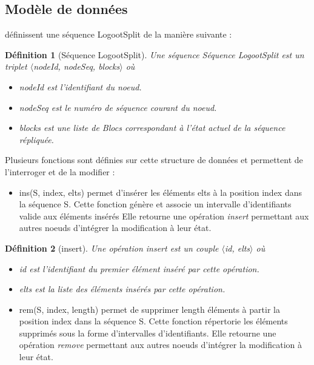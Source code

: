 \documentclass[12pt]{thesul}
\newtheorem{definition}{Définition}
\begin{document}
\subsection{Modèle de données}

\textcite{2013-logootsplit} définissent une séquence LogootSplit de la manière suivante :

\begin{definition}[Séquence LogootSplit]
  Une séquence \emph{Séquence LogootSplit} est un triplet $\langle$nodeId, nodeSeq, blocks$\rangle$ où
  \begin{itemize}
    \item nodeId est l'identifiant du noeud.
    \item nodeSeq est le numéro de séquence courant du noeud.
    \item blocks est une liste de Blocs correspondant à l'état actuel de la séquence répliquée.
  \end{itemize}
\end{definition}

Plusieurs fonctions sont définies sur cette structure de données et permettent de l'interroger et de la modifier :

\begin{itemize}
  \item ins(S, index, elts) permet d'insérer les éléments elts à la position index dans la séquence S.
    Cette fonction génère et associe un intervalle d'identifiants valide aux éléments insérés
    Elle retourne une opération \emph{insert} permettant aux autres noeuds d'intégrer la modification à leur état.
\end{itemize}

\begin{definition}[insert]
  Une opération \emph{insert} est un couple $\langle$id, elts$\rangle$ où
  \begin{itemize}
    \item id est l'identifiant du premier élément inséré par cette opération.
    \item elts est la liste des éléments insérés par cette opération.
  \end{itemize}
\end{definition}

\begin{itemize}
  \item rem(S, index, length) permet de supprimer length éléments à partir la position index dans la séquence S.
  Cette fonction répertorie les éléments supprimés sous la forme d'intervalles d'identifiants.
  Elle retourne une opération \emph{remove} permettant aux autres noeuds d'intégrer la modification à leur état.
\end{itemize}
\end{document}

